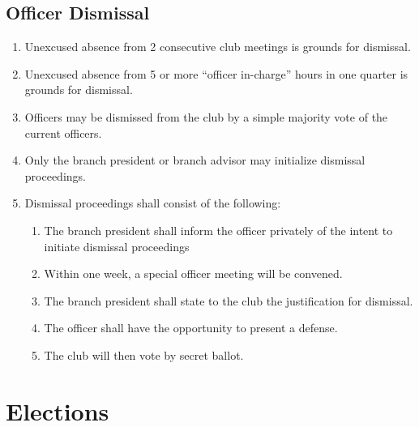 \documentclass{article}
\begin{document}
\subsection{Officer Dismissal}
\begin{enumerate}
\item Unexcused absence from 2 consecutive club meetings is grounds for dismissal.
\item Unexcused absence from 5 or more ``officer in-charge'' hours in one quarter is grounds for dismissal.
\item Officers may be dismissed from the club by a simple majority vote of the current officers.
\item Only the branch president or branch advisor may initialize dismissal proceedings.
\item Dismissal proceedings shall consist of the following:
  \begin{enumerate}
    \item The branch president shall inform the officer privately of the intent to initiate dismissal proceedings
    \item Within one week, a special officer meeting will be convened.
    \item The branch president shall state to the club the justification for dismissal.
    \item The officer shall have the opportunity to present a defense.
    \item The club will then vote by secret ballot.
  \end{enumerate}
\end{enumerate}

\section{Elections}
\end{document}
